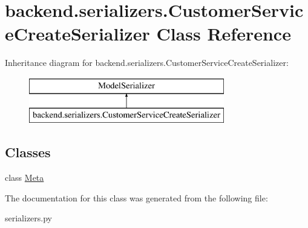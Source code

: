 \hypertarget{classbackend_1_1serializers_1_1_customer_service_create_serializer}{}\section{backend.\+serializers.\+Customer\+Service\+Create\+Serializer Class Reference}
\label{classbackend_1_1serializers_1_1_customer_service_create_serializer}
Inheritance diagram for backend.\+serializers.\+Customer\+Service\+Create\+Serializer\+:\begin{figure}[H]
\begin{center}
\leavevmode
\includegraphics[height=2.000000cm]{classbackend_1_1serializers_1_1_customer_service_create_serializer}
\end{center}
\end{figure}
\subsection*{Classes}
\begin{DoxyCompactItemize}
\item 
class \hyperlink{classbackend_1_1serializers_1_1_customer_service_create_serializer_1_1_meta}{Meta}
\end{DoxyCompactItemize}


The documentation for this class was generated from the following file\+:\begin{DoxyCompactItemize}
\item 
serializers.\+py\end{DoxyCompactItemize}
